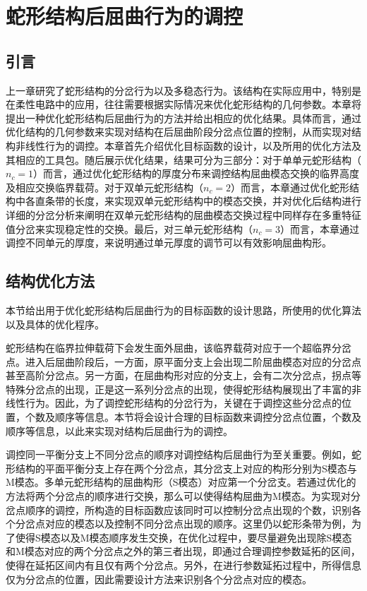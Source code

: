 
\chapter{蛇形结构后屈曲行为的调控}
\section{引言}
上一章研究了蛇形结构的分岔行为以及多稳态行为。该结构在实际应用中，特别是在柔性电路中的应用，往往需要根据实际情况来优化蛇形结构的几何参数。本章将提出一种优化蛇形结构后屈曲行为的方法并给出相应的优化结果。具体而言，通过优化结构的几何参数来实现对结构在后屈曲阶段分岔点位置的控制，从而实现对结构非线性行为的调控。本章首先介绍优化目标函数的设计，以及所用的优化方法及其相应的工具包。随后展示优化结果，结果可分为三部分：对于单单元蛇形结构（$n_c=1$）而言，通过优化蛇形结构的厚度分布来调控结构屈曲模态交换的临界高度及相应交换临界载荷。对于双单元蛇形结构（$n_c=2$）而言，本章通过优化蛇形结构中各直条带的长度，来实现双单元蛇形结构中的模态交换，并对优化后结构进行详细的分岔分析来阐明在双单元蛇形结构的屈曲模态交换过程中同样存在多重特征值分岔来实现稳定性的交换。最后，对三单元蛇形结构（$n_c=3$）而言，本章通过调控不同单元的厚度，来说明通过单元厚度的调节可以有效影响屈曲构形。
\section{结构优化方法}
本节给出用于优化蛇形结构后屈曲行为的目标函数的设计思路，所使用的优化算法以及具体的优化程序。

蛇形结构在临界拉伸载荷下会发生面外屈曲，该临界载荷对应于一个超临界分岔点。进入后屈曲阶段后，一方面，原平面分支上会出现二阶屈曲模态对应的分岔点甚至高阶分岔点。另一方面，在屈曲构形对应的分支上，会有二次分岔点，拐点等特殊分岔点的出现，正是这一系列分岔点的出现，使得蛇形结构展现出了丰富的非线性行为。因此，为了调控蛇形结构的分岔行为，关键在于调控这些分岔点的位置，个数及顺序等信息。本节将会设计合理的目标函数来调控分岔点位置，个数及顺序等信息，以此来实现对结构后屈曲行为的调控。

调控同一平衡分支上不同分岔点的顺序对调控结构后屈曲行为至关重要。例如，蛇形结构的平面平衡分支上存在两个分岔点，其分岔支上对应的构形分别为S模态与M模态。多单元蛇形结构的屈曲构形（S模态）对应第一个分岔支。若通过优化的方法将两个分岔点的顺序进行交换，那么可以使得结构屈曲为M模态。为实现对分岔点顺序的调控，所构造的目标函数应该同时可以控制分岔点出现的个数，识别各个分岔点对应的模态以及控制不同分岔点出现的顺序。这里仍以蛇形条带为例，为了使得S模态以及M模态顺序发生交换，在优化过程中，要尽量避免出现除S模态和M模态对应的两个分岔点之外的第三者出现，即通过合理调控参数延拓的区间，使得在延拓区间内有且仅有两个分岔点。另外，在进行参数延拓过程中，所得信息仅为分岔点的位置，因此需要设计方法来识别各个分岔点对应的模态。

